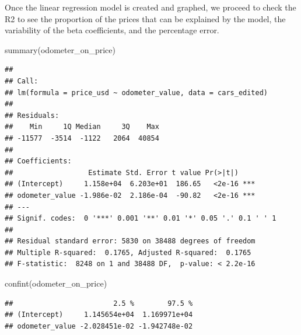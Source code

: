 \documentclass[
]{article}
\newenvironment{Shaded}{\begin{snugshade}}{\end{snugshade}}
\newcommand{\CommentTok}[1]{\textcolor[rgb]{0.56,0.35,0.01}{\textit{#1}}}
\newcommand{\DecValTok}[1]{\textcolor[rgb]{0.00,0.00,0.81}{#1}}
\newcommand{\FunctionTok}[1]{\textcolor[rgb]{0.00,0.00,0.00}{#1}}
\newcommand{\NormalTok}[1]{#1}
\newcommand{\SpecialCharTok}[1]{\textcolor[rgb]{0.00,0.00,0.00}{#1}}
\begin{document}
Once the linear regression model is created and graphed, we proceed to
check the R2 to see the proportion of the prices that can be explained
by the model, the variability of the beta coefficients, and the
percentage error.

\begin{Shaded}
\begin{Highlighting}[]
\FunctionTok{summary}\NormalTok{(odometer\_on\_price)}
\end{Highlighting}
\end{Shaded}

\begin{verbatim}
## 
## Call:
## lm(formula = price_usd ~ odometer_value, data = cars_edited)
## 
## Residuals:
##    Min     1Q Median     3Q    Max 
## -11577  -3514  -1122   2064  40854 
## 
## Coefficients:
##                  Estimate Std. Error t value Pr(>|t|)    
## (Intercept)     1.158e+04  6.203e+01  186.65   <2e-16 ***
## odometer_value -1.986e-02  2.186e-04  -90.82   <2e-16 ***
## ---
## Signif. codes:  0 '***' 0.001 '**' 0.01 '*' 0.05 '.' 0.1 ' ' 1
## 
## Residual standard error: 5830 on 38488 degrees of freedom
## Multiple R-squared:  0.1765, Adjusted R-squared:  0.1765 
## F-statistic:  8248 on 1 and 38488 DF,  p-value: < 2.2e-16
\end{verbatim}

\begin{Shaded}
\begin{Highlighting}[]
\FunctionTok{confint}\NormalTok{(odometer\_on\_price)}
\end{Highlighting}
\end{Shaded}

\begin{verbatim}
##                        2.5 %        97.5 %
## (Intercept)     1.145654e+04  1.169971e+04
## odometer_value -2.028451e-02 -1.942748e-02
\end{verbatim}

\begin{Shaded}
\end{Shaded}
\end{document}
